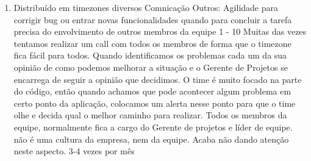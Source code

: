 \begin{enumerate}
	\item
	\begin{respostas3}
		{Distribuído em timezones diversos}
		{Comnicação \newline Outros: Agilidade para corrigir bug ou entrar novas funcionalidades quando para concluir a tarefa precisa do envolvimento de outros membros da equipe}
		{1 - 10}
		{Muitas das vezes tentamos realizar um call com todos os membros de forma que o timezone fica fácil para todos. Quando identificamos os problemas cada um da sua opinião de como podemos melhorar a situação e o Gerente de Projetos se encarrega de seguir a opinião que decidimos.}
		{O time é muito focado na parte do código, então quando achamos que pode acontecer algum problema em certo ponto da aplicação, colocamos um alerta nesse ponto para que o time olhe e decida qual o melhor caminho para realizar.}
		{Todos os membros da equipe, normalmente fica a cargo do Gerente de projetos e lí­der de equipe.}
		{não é uma cultura da empresa, nem da equipe. Acaba não dando atenção neste aspecto.}
		{3-4 vezes por mês}
	\end{respostas3}

\end{enumerate}